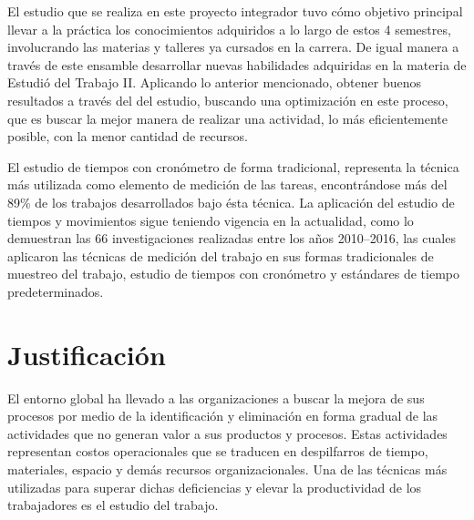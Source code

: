             El estudio que se realiza en este proyecto integrador tuvo cómo objetivo principal llevar a la práctica los conocimientos adquiridos a lo largo de estos 4 semestres, involucrando las materias y talleres ya cursados en la carrera. De igual manera a través de este ensamble desarrollar nuevas habilidades adquiridas en la materia de Estudió del Trabajo II. Aplicando lo anterior mencionado, obtener buenos resultados a través del del estudio, buscando  una optimización en este proceso, que es buscar la mejor manera de realizar una actividad, lo más eficientemente posible, con la menor cantidad de recursos.
            
            El estudio de tiempos con cronómetro de forma tradicional, representa la técnica más utilizada como elemento de medición de las tareas, encontrándose más del 89\% de los trabajos desarrollados bajo ésta técnica.
            La aplicación del estudio de tiempos y movimientos sigue teniendo vigencia en la actualidad, como lo demuestran las 66 investigaciones realizadas entre los años 2010–2016, las cuales aplicaron las técnicas de medición del trabajo en sus formas tradicionales de muestreo del trabajo, estudio de tiempos con cronómetro y estándares de tiempo predeterminados.
            \cite{andrade2019estudio}
            
             
            \section{Justificación}
            
            El entorno global ha llevado a las organizaciones a buscar la mejora de sus procesos por medio de la identificación y eliminación en forma gradual de las actividades que no generan valor a sus productos y procesos. Estas actividades representan costos operacionales que se traducen en despilfarros de tiempo, materiales, espacio y demás recursos organizacionales. Una de las técnicas más utilizadas para superar dichas deficiencias y elevar la productividad de los trabajadores es el estudio del trabajo.
                
            
